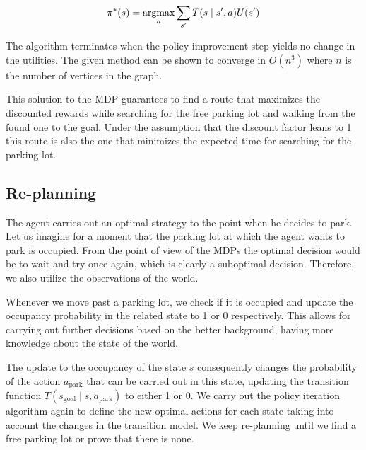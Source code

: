 \begin{equation}
\label{lbl:optimal_policy}
\pi^*(s) = \mathop{\rm argmax}_a \sum_{s'} T(s \mid s', a)U(s')
\end{equation}

The algorithm terminates when the policy improvement step yields no change in
the utilities. The given method can be shown to converge in $O(n^3)$ where $n$
is the number of vertices in the graph.

This solution to the MDP guarantees to find a route that maximizes the
discounted rewards while searching for the free parking lot and walking from
the found one to the goal. Under the assumption that the discount factor leans
to 1 this route is also the one that minimizes the expected time for searching
for the parking lot.

\subsection{Re-planning} %
\label{sub:re_planning}

The agent carries out an optimal strategy to the point when he decides to
park. Let us imagine for a moment that the parking lot at which the agent
wants to park is occupied. From the point of view of the MDPs the optimal
decision would be to wait and try once again, which is clearly a suboptimal
decision. Therefore, we also utilize the observations of the world.

Whenever we move past a parking lot, we check if it is occupied and update the
occupancy probability in the related state to 1 or 0 respectively. This allows
for carrying out further decisions based on the better background, having more
knowledge about the state of the world.

The update to the occupancy of the state $s$ consequently changes the
probability of the action $a_\mathrm{park}$ that can be carried out in this
state, updating the transition function $T(s_\mathrm{goal} \mid s,
a_\mathrm{park})$ to either 1 or 0. We carry out the policy iteration
algorithm again to define the new optimal actions for each state taking into
account the changes in the transition model. We keep re-planning until we find
a free parking lot or prove that there is none.



